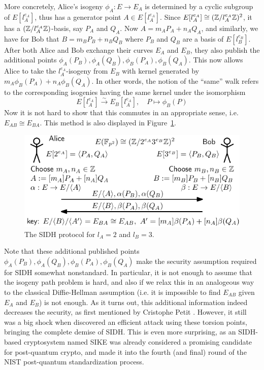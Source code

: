 More concretely, Alice's isogeny $\phi_A: E \to E_A$ is determined by a cyclic subgroup of $E[l_A^{e_A}]$, thus has a generator point $A \in E[l_A^{e_A}]$.
Since $E[l_A^{e_A}] \cong (\mathbb{Z}/l_A^{e_A}\mathbb{Z})^2$, it has a $(\mathbb{Z}/l_A^{e_A}\mathbb{Z})$-basis, say $P_A$ and $Q_A$.
Now $A = m_A P_A + n_A Q_A$, and similarly, we have for Bob that $B = m_B P_B + n_B Q_B$ where $P_B$ and $Q_B$ are a basis of $E[l_B^{e_B}]$.
After both Alice and Bob exchange their curves $E_A$ and $E_B$, they also publish the additional points $\phi_A(P_B), \phi_A(Q_B), \phi_B(P_A), \phi_B(Q_A)$.
This now allows Alice to take the $l_A^{e_A}$-isogeny from $E_B$ with kernel generated by $m_A \phi_B(P_A) + n_A \phi_B(Q_A)$.
In other words, the notion of the ``same'' walk refers to the corresponding isogenies having the same kernel under the isomorphism
\begin{equation*}
    E[l_A^{e_A}] \overset{\sim}{\longrightarrow} E_B[l_A^{e_A}], \quad P \mapsto \phi_B(P)
\end{equation*}
Now it is not hard to show that this commutes in an appropriate sense, i.e. $E_{AB} \cong E_{BA}$.
This method is also displayed in Figure~\ref{fig:sidh}.
\begin{figure}
    \includegraphics[width = \textwidth]{./sidh.pdf}
    \caption{\label{fig:sidh} The SIDH protocol for $l_A = 2$ and $l_B = 3$.}
\end{figure}

Note that these additional published points $\phi_A(P_B), \phi_A(Q_B), \phi_B(P_A), \phi_B(Q_A)$ make the security assumption required for SIDH somewhat nonstandard.
In particular, it is not enough to assume that the isogeny path problem is hard, and also if we relax this in an analogeous way to the classical Diffie-Hellman assumption (i.e. it is impossible to find $E_{AB}$ given $E_A$ and $E_B$) is not enough.
As it turns out, this additional information indeed decreases the security, as first mentioned by Cristophe Petit \cite{torsion_point_attack}.
However, it still was a big shock when \cite{sidh_broken} discovered an efficient attack using these torsion points, bringing the complete demise of SIDH.
This is even more surprising, as an SIDH-based cryptosystem named SIKE \cite{sike} was already considered a promising candidate for post-quantum crypto, and made it into the fourth (and final) round of the NIST post-quantum standardization process.